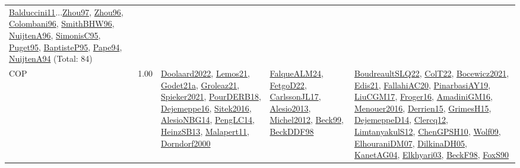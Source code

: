 {\begin{longtable}{p{3cm}r>{\raggedright\arraybackslash}p{6cm}>{\raggedright\arraybackslash}p{6cm}>{\raggedright\arraybackslash}p{8cm}}
\hyperref[detail:Balduccini11]{Balduccini11}...\hyperref[detail:Zhou97]{Zhou97}, \hyperref[detail:Zhou96]{Zhou96}, \hyperref[detail:Colombani96]{Colombani96}, \hyperref[detail:SmithBHW96]{SmithBHW96}, \hyperref[detail:NuijtenA96]{NuijtenA96}, \hyperref[detail:SimonisC95]{SimonisC95}, \hyperref[detail:Puget95]{Puget95}, \hyperref[detail:BaptisteP95]{BaptisteP95}, \hyperref[detail:Pape94]{Pape94}, \hyperref[detail:NuijtenA94]{NuijtenA94} (Total: 84)\\
\index{COP}\index{CP!COP}COP &  1.00 & \hyperref[detail:Doolaard2022]{Doolaard2022}, \hyperref[detail:Lemos21]{Lemos21}, \hyperref[detail:Godet21a]{Godet21a}, \hyperref[detail:Groleaz21]{Groleaz21}, \hyperref[detail:Spieker2021]{Spieker2021}, \hyperref[detail:PourDERB18]{PourDERB18}, \hyperref[detail:Dejemeppe16]{Dejemeppe16}, \hyperref[detail:Sitek2016]{Sitek2016}, \hyperref[detail:AlesioNBG14]{AlesioNBG14}, \hyperref[detail:PengLC14]{PengLC14}, \hyperref[detail:HeinzSB13]{HeinzSB13}, \hyperref[detail:Malapert11]{Malapert11}, \hyperref[detail:Dorndorf2000]{Dorndorf2000} & \hyperref[detail:FalqueALM24]{FalqueALM24}, \hyperref[detail:FetgoD22]{FetgoD22}, \hyperref[detail:CarlssonJL17]{CarlssonJL17}, \hyperref[detail:Alesio2013]{Alesio2013}, \hyperref[detail:Michel2012]{Michel2012}, \hyperref[detail:Beck99]{Beck99}, \hyperref[detail:BeckDDF98]{BeckDDF98} & \hyperref[detail:BoudreaultSLQ22]{BoudreaultSLQ22}, \hyperref[detail:ColT22]{ColT22}, \hyperref[detail:Bocewicz2021]{Bocewicz2021}, \hyperref[detail:Edis21]{Edis21}, \hyperref[detail:FallahiAC20]{FallahiAC20}, \hyperref[detail:PinarbasiAY19]{PinarbasiAY19}, \hyperref[detail:LiuCGM17]{LiuCGM17}, \hyperref[detail:Froger16]{Froger16}, \hyperref[detail:AmadiniGM16]{AmadiniGM16}, \hyperref[detail:Menouer2016]{Menouer2016}, \hyperref[detail:Derrien15]{Derrien15}, \hyperref[detail:GrimesH15]{GrimesH15}, \hyperref[detail:DejemeppeD14]{DejemeppeD14}, \hyperref[detail:Clercq12]{Clercq12}, \hyperref[detail:LimtanyakulS12]{LimtanyakulS12}, \hyperref[detail:ChenGPSH10]{ChenGPSH10}, \hyperref[detail:Wolf09]{Wolf09}, \hyperref[detail:ElhouraniDM07]{ElhouraniDM07}, \hyperref[detail:DilkinaDH05]{DilkinaDH05}, \hyperref[detail:KanetAG04]{KanetAG04}, \hyperref[detail:Elkhyari03]{Elkhyari03}, \hyperref[detail:BeckF98]{BeckF98}, \hyperref[detail:FoxS90]{FoxS90}\\

\end{longtable}}
